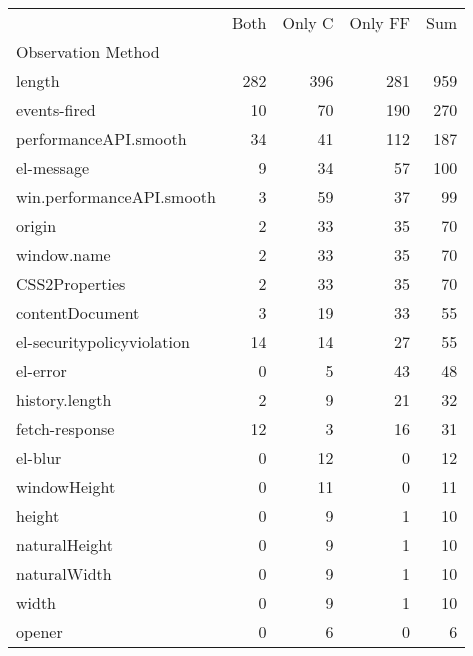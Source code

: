 \begin{tabular}{lrrrr}
\toprule
 & Both & Only C & Only FF & Sum \\
Observation Method &  &  &  &  \\
\midrule
length & 282 & 396 & 281 & 959 \\
events-fired & 10 & 70 & 190 & 270 \\
performanceAPI.smooth & 34 & 41 & 112 & 187 \\
el-message & 9 & 34 & 57 & 100 \\
win.performanceAPI.smooth & 3 & 59 & 37 & 99 \\
origin & 2 & 33 & 35 & 70 \\
window.name & 2 & 33 & 35 & 70 \\
CSS2Properties & 2 & 33 & 35 & 70 \\
contentDocument & 3 & 19 & 33 & 55 \\
el-securitypolicyviolation & 14 & 14 & 27 & 55 \\
el-error & 0 & 5 & 43 & 48 \\
history.length & 2 & 9 & 21 & 32 \\
fetch-response & 12 & 3 & 16 & 31 \\
el-blur & 0 & 12 & 0 & 12 \\
windowHeight & 0 & 11 & 0 & 11 \\
height & 0 & 9 & 1 & 10 \\
naturalHeight & 0 & 9 & 1 & 10 \\
naturalWidth & 0 & 9 & 1 & 10 \\
width & 0 & 9 & 1 & 10 \\
opener & 0 & 6 & 0 & 6 \\
\bottomrule
\end{tabular}
